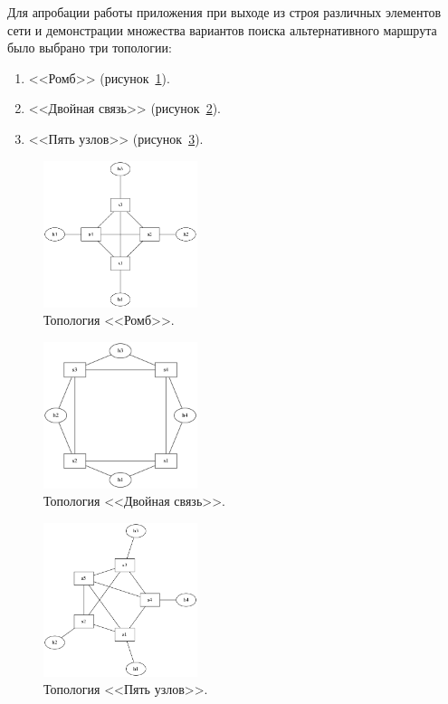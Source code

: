 \documentclass[12pt, a4paper]{article}
\begin{document}
Для апробации работы приложения при выходе из строя различных элементов сети и демонстрации множества вариантов поиска альтернативного маршрута было выбрано три топологии:
\begin{enumerate}
	\item <<Ромб>> (рисунок~\ref{pic:4node}).
	\item <<Двойная связь>> (рисунок~\ref{pic:double}).
	\item <<Пять узлов>> (рисунок~\ref{pic:5node}).
\end{enumerate}

\begin{figure}[h!]
	\centering
	\includegraphics[width=0.40\textwidth]{img/4node.png}
	\caption{Топология <<Ромб>>.}
	\label{pic:4node}
\end{figure}

\begin{figure}[h!]
	\centering
	\includegraphics[width=0.40\textwidth]{img/double.png}
	\caption[russian]{Топология <<Двойная связь>>.}
	\label{pic:double}
\end{figure}

\begin{figure}[h!]
	\centering
	\includegraphics[width=0.40\textwidth]{img/5node.png}
	\caption{Топология <<Пять узлов>>.}
	\label{pic:5node}
\end{figure}
\end{document}
